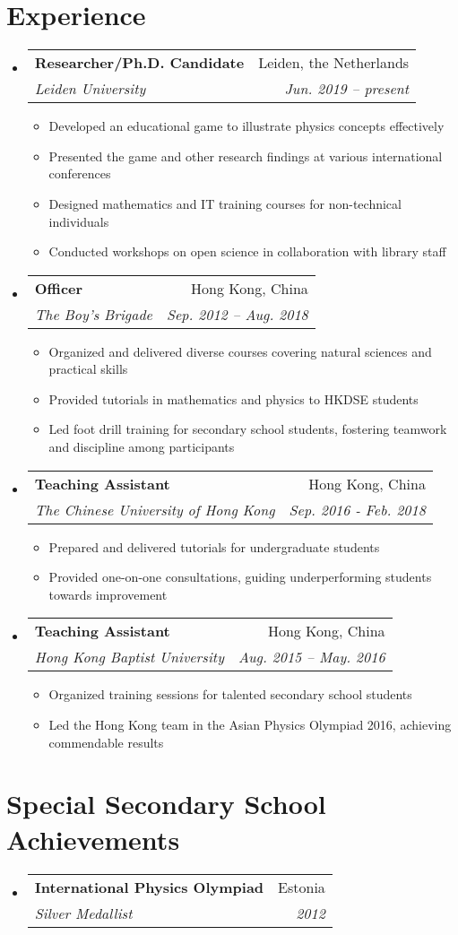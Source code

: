 \documentclass[letterpaper,11pt]{article}
\makeatletter
\newcommand{\resumeItem}[1]{
  \item\small{
    {#1 \vspace{-2pt}}
  }
}
\newcommand{\resumeSubheading}[4]{
  \vspace{-2pt}\item
    \begin{tabular*}{0.97\textwidth}[t]{l@{\extracolsep{\fill}}r}
      \textbf{#1} & #2 \\
      \textit{\small#3} & \textit{\small #4} \\
    \end{tabular*}\vspace{-7pt}
}
\newcommand{\resumeSubHeadingListStart}{\begin{itemize}[leftmargin=0.15in, label={}]}
\newcommand{\resumeSubHeadingListEnd}{\end{itemize}}
\newcommand{\resumeItemListStart}{\begin{itemize}}
\newcommand{\resumeItemListEnd}{\end{itemize}\vspace{-5pt}}
\makeatother
\begin{document}
\section{Experience}
  \resumeSubHeadingListStart

    \resumeSubheading
      {Researcher/Ph.D. Candidate}{Leiden, the Netherlands}
      {Leiden University}{Jun. 2019 -- present}
      \resumeItemListStart
        \resumeItem{Developed an educational game to illustrate physics concepts effectively}
        \resumeItem{Presented the game and other research findings at various international conferences}
        \resumeItem{Designed mathematics and IT training courses for non-technical individuals}
        \resumeItem{Conducted workshops on open science in collaboration with library staff}
      \resumeItemListEnd
      
    \resumeSubheading
      {Officer}{Hong Kong, China}
      {The Boy's Brigade}{Sep. 2012 -- Aug. 2018}
      \resumeItemListStart
        \resumeItem{Organized and delivered diverse courses covering natural sciences and practical skills}
        \resumeItem{Provided tutorials in mathematics and physics to HKDSE students}
        \resumeItem{Led foot drill training for secondary school students, fostering teamwork and discipline among participants}
      \resumeItemListEnd

    \resumeSubheading
      {Teaching Assistant}{Hong Kong, China}
      {The Chinese University of Hong Kong}{Sep. 2016 - Feb. 2018}
      \resumeItemListStart
        \resumeItem{Prepared and delivered tutorials for undergraduate students}
        \resumeItem{Provided one-on-one consultations, guiding underperforming students towards improvement}
      \resumeItemListEnd

    \resumeSubheading
      {Teaching Assistant}{Hong Kong, China}
      {Hong Kong Baptist University}{Aug. 2015 -- May. 2016}
      \resumeItemListStart
        \resumeItem{Organized training sessions for talented secondary school students}
        \resumeItem{Led the Hong Kong team in the Asian Physics Olympiad 2016, achieving commendable results}
      \resumeItemListEnd

  \resumeSubHeadingListEnd


\section{Special Secondary School Achievements}
  \resumeSubHeadingListStart
    \resumeSubheading
      {International Physics Olympiad}{Estonia}
      {Silver Medallist}{2012}
  \resumeSubHeadingListEnd
\end{document}
